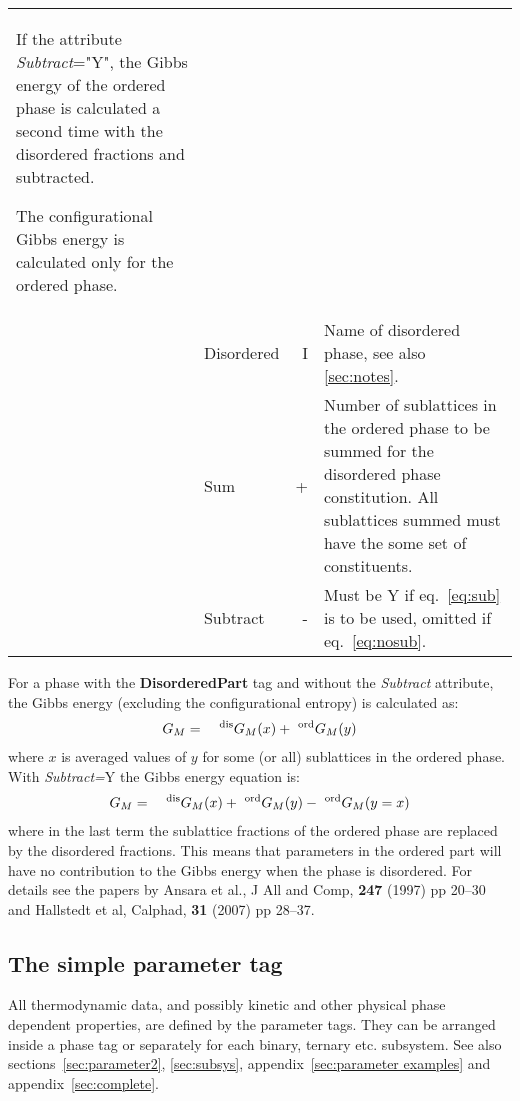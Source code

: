 \documentclass{article}
\begin{document}
\begin{tabular}{|p{} p{} r p{}|}
              If the attribute {\em Subtract}="Y", the Gibbs energy of
              the ordered phase is calculated a second time with the
              disordered fractions and subtracted.  

              The configurational Gibbs energy is calculated only for
              the ordered phase.\\

        & Disordered & I & Name of disordered phase, see also
                                  \ref{sec:notes}.\\
        & Sum & + & Number of sublattices in
              the ordered phase to be summed for the disordered phase
              constitution.  All sublattices summed must have the some
              set of constituents.\\
        & Subtract & - & Must be Y if eq.~\ref{eq:sub} is to be used, 
              omitted if eq.~\ref{eq:nosub}.\\\hline
\end{tabular}

\bigskip
For a phase with the {\bf DisorderedPart} tag and without the {\em
  Subtract} attribute, the Gibbs energy (excluding the configurational
entropy) is calculated as:
\begin{eqnarray}
G_M &=& ~^{\rm dis}G_M(x) + ~^{\rm ord}G_M(y) \label{eq:nosub}
\end{eqnarray}
where $x$ is averaged values of $y$ for some (or all) sublattices in the
ordered phase.   With {\em Subtract=}Y the Gibbs energy equation is:
\begin{eqnarray}
G_M &=& ~^{\rm dis}G_M(x) + ~^{\rm ord}G_M(y) - ~^{\rm ord}G_M(y=x) \label{eq:sub}
\end{eqnarray}
where in the last term the sublattice fractions of the ordered phase
are replaced by the disordered fractions.  This means that parameters
in the ordered part will have no contribution to the Gibbs energy when
the phase is disordered.  For details see the papers by Ansara et al.,
J All and Comp, {\bf 247} (1997) pp 20--30 and Hallstedt et al,
Calphad, {\bf 31} (2007) pp 28--37.

\newpage 

\subsection{The simple parameter tag}

All thermodynamic data, and possibly kinetic and other physical phase
dependent properties, are defined by the parameter tags.  They can be
arranged inside a phase tag or separately for each binary, ternary
etc. subsystem.  See also sections~\ref{sec:parameter2},
\ref{sec:subsys}, appendix~\ref{sec:parameter examples} and
appendix~\ref{sec:complete}.
\end{document}
